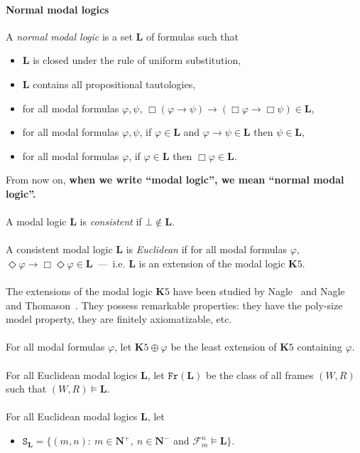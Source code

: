 \documentclass[draft]{article}
\def\Fr{\mathtt{Fr}}
\def\L{\mathbf{L}}
\def\K{\mathbf{K}}
\begin{document}
\paragraph{Normal modal logics}
%
%
A {\it normal modal logic}\/ is a set $\L$ of formulas such that
%
%
\begin{itemize}
%
%
\item $\L$ is closed under the rule of uniform substitution,
%
%
\item $\L$ contains all propositional tautologies,
%
%
\item for all modal formulas $\varphi,\psi$, $\Box(\varphi\rightarrow\psi)\rightarrow(\Box\varphi\rightarrow\Box\psi){\in}\L$,
%
%
\item for all modal formulas $\varphi,\psi$, if $\varphi{\in}\L$ and $\varphi\rightarrow\psi{\in}\L$ then $\psi{\in}\L$,
%
%
\item for all modal formulas $\varphi$, if $\varphi{\in}\L$ then $\Box\varphi{\in}\L$.
%
%
\end{itemize}
%
%
From now on, {\bf when we write ``modal logic'', we mean ``normal modal logic''.}
%
%
\\
\\
%
%
A modal logic $\L$ is {\it consistent}\/ if $\bot{\not\in}\L$.
%
%
\\
\\
%
%
A consistent modal logic $\L$ is {\it Euclidean}\/ if for all modal formulas $\varphi$, $\Diamond\varphi\rightarrow\Box\Diamond\varphi{\in}\L$~---~i.e. $\L$ is an extension of the modal logic $\K5$.
%
%
\\
\\
%
%
The extensions of the modal logic $\K5$ have been studied by Nagle~\cite{Nagle:1981} and Nagle and Thomason~\cite{Nagle:Thomason:1985}.
They possess remarkable properties: they have the poly-size model property, they are finitely axiomatizable, etc.
%
%
\\
\\
%
%
For all modal formulas $\varphi$, let $\K5{\oplus}\varphi$ be the least extension of $\K5$ containing $\varphi$.
%
%
\\
\\
%
%
For all Euclidean modal logics $\L$, let $\Fr(\L)$ be the class of all frames $(W,R)$ such that $(W,R){\models}\L$.
%
%
\\
\\
%
%
For all Euclidean modal logics $\L$, let
%
%
\begin{itemize}
%
%
\item $\mathtt{S}_{\L}{=}\{(m,n):\ m{\in}\mathbf{N}^{+},\ n{\in}\mathbf{N}^{-}$ and ${\mathcal F}_{m}^{n}{\models}\L\}$.
%
%
\end{itemize}
\end{document}
